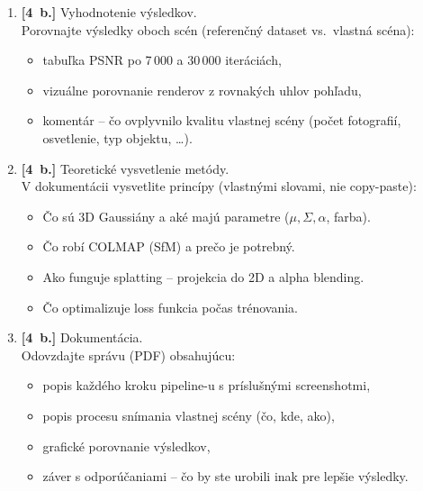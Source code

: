 \documentclass{article}
\begin{document}
\begin{enumerate}
Spustite celý pipeline rovnako ako v úlohe 1.
Uveďte dosiahnutú metriku PSNR a vizuálne porovnajte výsledok
s referenčným datasetom.

\item \textbf{[4~b.]} Vyhodnotenie výsledkov.\\
Porovnajte výsledky oboch scén (referenčný dataset vs.\ vlastná scéna):
\begin{itemize}
    \item tabuľka PSNR po 7\,000 a 30\,000 iteráciách,
    \item vizuálne porovnanie renderov z rovnakých uhlov pohľadu,
    \item komentár – čo ovplyvnilo kvalitu vlastnej scény
          (počet fotografií, osvetlenie, typ objektu, \ldots).
\end{itemize}

\item \textbf{[4~b.]} Teoretické vysvetlenie metódy.\\
V dokumentácii vysvetlite princípy (vlastnými slovami, nie copy-paste):
\begin{itemize}
    \item Čo sú 3D Gaussiány a aké majú parametre ($\mu, \Sigma, \alpha$, farba).
    \item Čo robí COLMAP (SfM) a prečo je potrebný.
    \item Ako funguje splatting – projekcia do 2D a alpha blending.
    \item Čo optimalizuje loss funkcia počas trénovania.
\end{itemize}

\item \textbf{[4~b.]} Dokumentácia.\\
Odovzdajte správu (PDF) obsahujúcu:
\begin{itemize}
    \item popis každého kroku pipeline-u s príslušnými screenshotmi,
    \item popis procesu snímania vlastnej scény (čo, kde, ako),
    \item grafické porovnanie výsledkov,
    \item záver s odporúčaniami – čo by ste urobili inak pre lepšie výsledky.
\end{itemize}

\end{enumerate}
\end{document}
